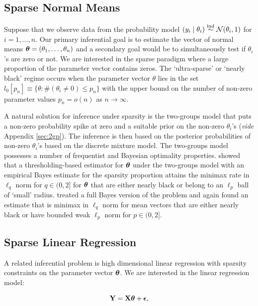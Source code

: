 \documentclass[sts,preprint]{imsart}
\begin{document}
\subsection{Sparse Normal Means} Suppose that we observe data from the probability model $(y_i \mid \theta_i)  \stackrel{\mathrm{ind}}{\sim} {\cal N} (\theta_i,1)$ for $i = 1, \ldots, n$. Our primary inferential goal is to estimate the vector of normal means $ \boldsymbol{\theta} = ( \theta_1, \ldots , \theta_n )$ and a secondary goal would be to simultaneously test if $\theta_i$'s are zero or not. We are interested in the sparse paradigm where a large proportion of the parameter
vector contains zeros.  {The `ultra-sparse' \citep{bhadra2015horseshoe+} or `nearly black' \citep{donoho1992maximum} regime occurs when the parameter vector $\theta$ lies in the set $ l_0[ p_n] \equiv \{ \theta : \# ( \theta_i \neq 0 ) \leq p_n \} $ with the upper bound on the number of non-zero parameter values $ p_n = o(n) $ as $ n \to \infty$.}

A natural solution for inference under sparsity is the two-groups model that puts a non-zero probability spike at zero and a suitable prior on the non-zero $\theta_i$'s (\textit{vide} Appendix \ref{sec:2gp}). The inference is then based on the posterior probabilities of non-zero $\theta_i$'s based on the discrete mixture model. The two-groups model possesses a number of frequentist and Bayesian optimality properties. \cite{johnstone2004needles} showed that a thresholding-based
estimator for $\boldsymbol{\theta}$ under the two-groups model with an empirical Bayes estimate for the sparsity proportion attains the minimax rate in $\ell_q$ norm for $q \in (0,2]$ for $\boldsymbol{\theta}$ that are either nearly black or belong to an $\ell_p$ ball of `small' radius. \cite{castillo2012needles} treated a full Bayes version of the problem and again found an estimate that is minimax in $\ell_q$ norm for mean vectors that are either nearly black or have bounded weak $\ell_p$ norm for $p \in (0,2]$. 


\subsection{Sparse Linear Regression} 

A related inferential problem is high dimensional linear regression with sparsity constraints on the parameter vector $\boldsymbol{\theta}$. We are interested in the linear regression model:

\[
{\bf Y} = {\bf X} \boldsymbol{\theta} + \boldsymbol{\epsilon},
\]
\end{document}
